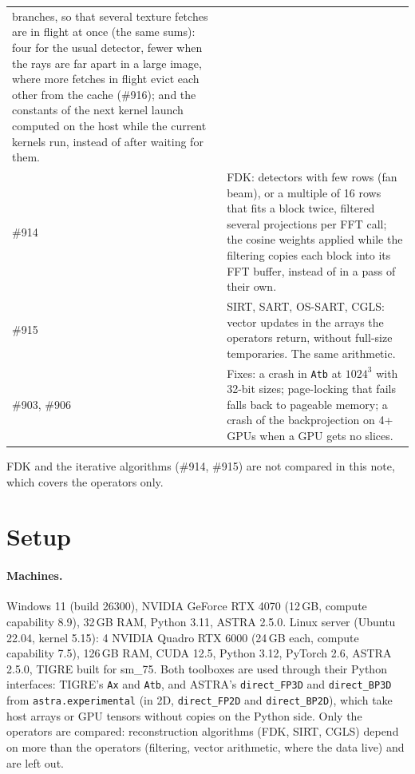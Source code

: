 \documentclass[11pt,a4paper]{article}
\begin{document}
\begin{table}[H]
\begin{tabular}{>{\raggedright}p{}>{\raggedright\arraybackslash}p{}}
branches, so that several texture fetches are in flight at once (the same sums): four for the usual detector,
fewer when the rays are far apart in a large image, where more fetches in flight evict each other from the
cache (\#916); and the constants of the next kernel launch computed on the host while the current kernels run,
instead of after waiting for them.\\
\#914 & FDK: detectors with few rows (fan beam), or a multiple of 16 rows that fits a block twice, filtered
several projections per FFT call; the cosine weights applied while the filtering copies each block into its FFT
buffer, instead of in a pass of their own.\\
\#915 & SIRT, SART, OS-SART, CGLS: vector updates in the arrays the operators return, without full-size
temporaries. The same arithmetic.\\
\#903, \#906 & Fixes: a crash in \texttt{Atb} at $1024^3$ with 32-bit sizes; page-locking that fails falls back to
pageable memory; a crash of the backprojection on 4+ GPUs when a GPU gets no slices.\\
\bottomrule
\end{tabular}
\end{table}
FDK and the iterative algorithms (\#914, \#915) are not compared in this note, which covers the operators only.

\section{Setup}\label{sec:setup}
\paragraph{Machines.}
Windows 11 (build 26300), NVIDIA GeForce RTX 4070 (12\,GB, compute capability 8.9), 32\,GB RAM, Python 3.11,
ASTRA 2.5.0. Linux server (Ubuntu 22.04, kernel 5.15): 4 NVIDIA Quadro RTX 6000 (24\,GB each, compute capability
7.5), 126\,GB RAM, CUDA 12.5, Python 3.12, PyTorch 2.6, ASTRA 2.5.0, TIGRE built for sm\_75. Both toolboxes are used through their Python interfaces:
TIGRE's \texttt{Ax} and \texttt{Atb}, and ASTRA's \texttt{direct\_FP3D} and \texttt{direct\_BP3D} from
\texttt{astra.experimental} (in 2D, \texttt{direct\_FP2D} and \texttt{direct\_BP2D}), which take host arrays or GPU tensors without copies on the Python side. Only the operators are compared:
reconstruction algorithms (FDK, SIRT, CGLS) depend on more than the operators (filtering, vector arithmetic,
where the data live) and are left out.
\end{document}
